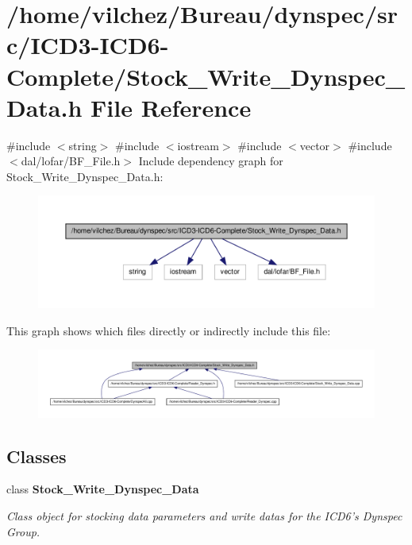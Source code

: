 \section{/home/vilchez/\-Bureau/dynspec/src/\-I\-C\-D3-\/\-I\-C\-D6-\/\-Complete/\-Stock\-\_\-\-Write\-\_\-\-Dynspec\-\_\-\-Data.h \-File \-Reference}
\label{_stock___write___dynspec___data_8h}
{\ttfamily \#include $<$string$>$}\*
{\ttfamily \#include $<$iostream$>$}\*
{\ttfamily \#include $<$vector$>$}\*
{\ttfamily \#include $<$dal/lofar/\-B\-F\-\_\-\-File.\-h$>$}\*
\-Include dependency graph for \-Stock\-\_\-\-Write\-\_\-\-Dynspec\-\_\-\-Data.\-h\-:\nopagebreak
\begin{figure}[H]
\begin{center}
\leavevmode
\includegraphics[width=350pt]{_stock___write___dynspec___data_8h__incl}
\end{center}
\end{figure}
\-This graph shows which files directly or indirectly include this file\-:\nopagebreak
\begin{figure}[H]
\begin{center}
\leavevmode
\includegraphics[width=350pt]{_stock___write___dynspec___data_8h__dep__incl}
\end{center}
\end{figure}
\subsection*{\-Classes}
\begin{DoxyCompactItemize}
\item 
class {\bf \-Stock\-\_\-\-Write\-\_\-\-Dynspec\-\_\-\-Data}
\begin{DoxyCompactList}\small\item\em \-Class object for stocking data parameters and write datas for the \-I\-C\-D6's \-Dynspec \-Group. \end{DoxyCompactList}\end{DoxyCompactItemize}
